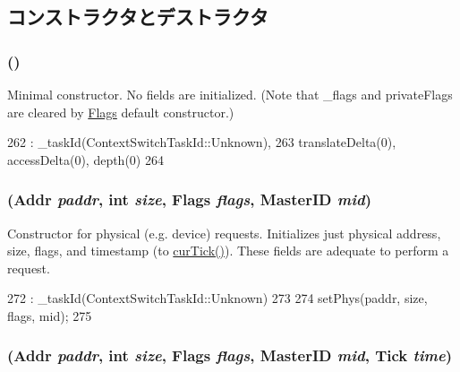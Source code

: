 \subsection{コンストラクタとデストラクタ}
\hypertarget{classRequest_ad69bb2076d5c4f1eb4b98cb3e0e2efa3}{
\subsubsection[{Request}]{ ()}}
\label{classRequest_ad69bb2076d5c4f1eb4b98cb3e0e2efa3}
Minimal constructor. No fields are initialized. (Note that \_\-flags and privateFlags are cleared by \hyperlink{classFlags}{Flags} default constructor.) 


\begin{DoxyCode}
262         : _taskId(ContextSwitchTaskId::Unknown),
263         translateDelta(0), accessDelta(0), depth(0)
264     {}
\end{DoxyCode}
\hypertarget{classRequest_a0f0fbabba0a0f6d8ffb2d5ec32d4d6b2}{
\subsubsection[{Request}]{ ({\bf Addr} {\em paddr}, \/  int {\em size}, \/  {\bf Flags} {\em flags}, \/  {\bf MasterID} {\em mid})}}
\label{classRequest_a0f0fbabba0a0f6d8ffb2d5ec32d4d6b2}
Constructor for physical (e.g. device) requests. Initializes just physical address, size, flags, and timestamp (to \hyperlink{statistics_8hh_a7acdccbf0d35ce0c159c0cdd36371b22}{curTick()}). These fields are adequate to perform a request. 


\begin{DoxyCode}
272         : _taskId(ContextSwitchTaskId::Unknown)
273     {
274         setPhys(paddr, size, flags, mid);
275     }
\end{DoxyCode}
\hypertarget{classRequest_a94b54d9620b2c2ec8d1327aa30dcd7e8}{
\subsubsection[{Request}]{ ({\bf Addr} {\em paddr}, \/  int {\em size}, \/  {\bf Flags} {\em flags}, \/  {\bf MasterID} {\em mid}, \/  {\bf Tick} {\em time})}}
\label{classRequest_a94b54d9620b2c2ec8d1327aa30dcd7e8}



